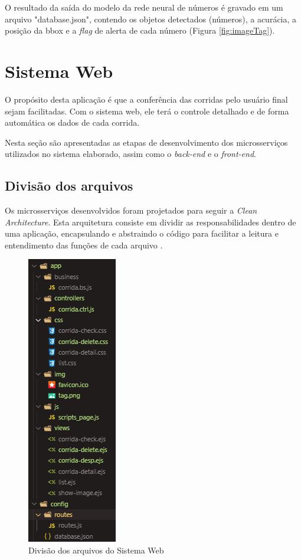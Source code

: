 O resultado da saída do modelo da rede neural de números é gravado em um arquivo "database.json", contendo os objetos detectados (números), a acurácia, a posição da bbox e a \textit{flag} de alerta de cada número (Figura \ref{fig:imageTag}).

\section{Sistema Web}
O propósito desta aplicação é que a conferência das corridas pelo usuário final sejam facilitadas. Com o sistema web, ele terá o controle detalhado e de forma automática os dados de cada corrida.

Nesta seção são apresentadas as etapas de desenvolvimento dos microsserviços utilizados no sistema elaborado, assim como o \textit{back-end} e o \textit{front-end}. 

\subsection*{Divisão dos arquivos}

Os microsserviços desenvolvidos foram projetados para seguir a \textit{Clean Architecture}. Esta arquitetura consiste em dividir as responsabilidades dentro de uma aplicação, encapsulando e abstraindo o código para facilitar a leitura e entendimento das funções de cada arquivo \cite{martin2000clean}.

\begin{figure}[htbp]
	\centering
	\includegraphics[width=0.22\linewidth]{figuras/WebService/cleanArchtecture.png}
	\caption{Divisão dos arquivos do Sistema Web}
	\label{fig:cleanArchtecture}
\end{figure}

